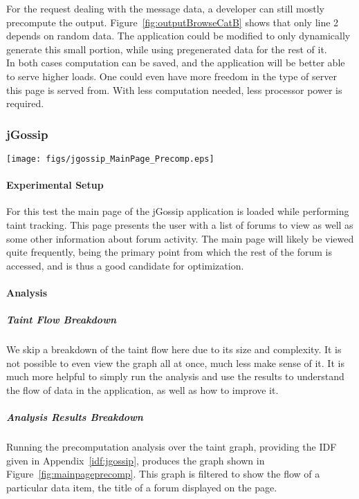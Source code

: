 \documentclass[msc,oneside]{ubcthesis}
\begin{document}
For the request dealing with the message data, a developer can still mostly precompute the output. Figure~\ref{fig:outputBrowseCatB} shows that only line 2 depends on random data. The application could be modified to only dynamically generate this small portion, while using pregenerated data for the rest of it.\\

In both cases computation can be saved, and the application will be better able to serve higher loads. One could even have more freedom in the type of server this page is served from. With less computation needed, less processor power is required.

\subsubsection{jGossip} 

\begin{sidewaysfigure}
\centering
\scalebox{0.42}
{\texttt{[image: figs/jgossip\_MainPage\_Precomp.eps]}}
\caption{jGossip Main Page Precomputation Analysis Results} 
\label{fig:mainpageprecomp}
\end{sidewaysfigure}

\paragraph{Experimental Setup}
For this test the main page of the jGossip application is loaded while performing taint tracking. This page presents the user with a list of forums to view as well as some other information about forum activity. The main page will likely be viewed quite frequently, being the primary point from which the rest of the forum is accessed, and is thus a good candidate for optimization.

\paragraph{Analysis}
\subparagraph{Taint Flow Breakdown}
We skip a breakdown of the taint flow here due to its size and complexity. It is not possible to even view the graph all at once, much less make sense of it. It is much more helpful to simply run the analysis and use the results to understand the flow of data in the application, as well as how to improve it.

\subparagraph{Analysis Results Breakdown}
Running the precomputation analysis over the taint graph, providing the IDF given in Appendix~\ref{idf:jgossip}, produces the graph shown in Figure~\ref{fig:mainpageprecomp}. This graph is filtered to show the flow of a particular data item, the title of a forum displayed on the page.\\
\end{document}
